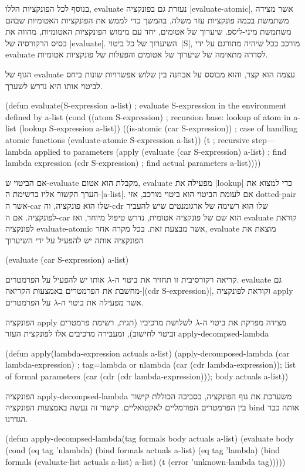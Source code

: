 בנוסף לכל הפונקציות הללו, evaluate נעזרת גם בפונקציה \E|evaluate-atomic|, אשר
מצידה משתמשת בכמה פונקציות עזר משלה, בהמשך כדי לממש את הפונקציות האטומיות שבהם
משתמשת מיני-ליספ. שיערוך של אטומים, יחד עם מימוש הפונקציות האטומיות, מהווה את
בסיס הרקורסיה של \E|evaluate|. השיערוך של כל ביטוי~\E|S|, מורכב ככל שיהיה
מתורגם על ידי evaluate לסדרה מתאימה של שיערוך של אטומים והפעלות של פונקציות
אטומיות.

הגוף של evaluate עצמה הוא קצר, והוא מבוסס על אבחנה בין שלוש אפשרויות שונות ביחס
לביטוי אותו היא נדרש לשערך.

\minipage\textwidth
\begin{KERNEL}
(defun evaluate(S-expression a-list) ; evaluate S-expression in the environment defined by a-list
  (cond ((atom S-expression) ; recursion base: lookup of atom in a-list
          (lookup S-expression a-list))
        ((is-atomic (car S-expression)) ; case of handling atomic functions
          (evaluate-atomic S-expression a-list))
        (t ; recursive step---lambda applied to parameters
          (apply (evaluate (car S-expression) a-list) ; find lambda expression
                  (cdr S-expression) ; find actual parameters
                  a-list))))
\end{KERNEL}
\endminipage

אם הביטוי ש-evaluate מקבלת הוא אטום, evaluate מפעילה את \E|lookup| כדי למצוא את
הערך הקשור אליו ברשימת ה-\E|a-list|. אם לעומת הביטוי הוא ביטוי מורכב, אזי
dotted-pair אשר ה-car שלו הוא פונקציה, וה-cdr שלו הוא רשימה של
ארגומנטים שיש להעביר לפונקציה. אם ה-car הוא שם של פונקציה אטומית, נדרש טיפול
מיוחד, ואז evaluate קוראת לפונקציה evaluate-atomic אשר מבצעת זאת.
בכל מקרה אחר, evaluate מוצאת את הפונקציה אותה יש להפעיל על ידי השיערוך
\begin{LISP}
(evaluate (car S-expression) a-list)
\end{LISP}
קריאה רקורסיבית זו תחזיר את ביטוי ה-$λ$ אותו יש להפעיל על הפרמטרים. evaluate
גם מחשבת את הפרמטרים באמצעות הקריאה-\T|(cdr S-expression)|, וקוראת לפונקציה
apply אשר מפעילה את ביטוי ה-$λ$ על הפרמטרים.

הפונקציה apply מצידה מפרקת את ביטוי ה-$λ$ לשלושת מרכיביו (תגית, רשימת פרמטרים
וביטוי לחישוב), ומעבירה מרכיבים אלו לפונקצית העזר apply-decompsed-lambda
\begin{KERNEL}
(defun apply(lambda-expression actuals a-list)
  (apply-decomposed-lambda
    (car lambda-expression) ; tag=lambda or nlambda
    (car (cdr lambda-expression)); list of formal parameters
    (car (cdr (cdr lambda-expression))); body
    actuals
    a-list))
\end{KERNEL}
הפונקציה apply-decompsed-lambda משערכת את גוף הפונקציה, בסביבה הכוללת קישור בין
הפרמטרים הפורמליים לאקטואליים. קישור זה נעשה באמצעות הפונקציה bind אותה כבר
הגדרנו.
\begin{KERNEL}
(defun apply-decompsed-lambda(tag formals body actuals a-list)
  (evaluate body
    (cond (eq tag 'nlambda) (bind formals actuals a-list)
          (eq tag 'lambda) (bind formals (evaluate-list actuals a-list) a-list)
          (t (error 'unknown-lambda tag)))))
\end{KERNEL}

